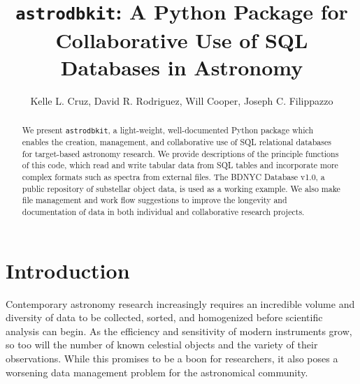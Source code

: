 \documentclass[iop,revtex4,natbib209]{emulateapj}
\begin{document}
\lstset{language=Python,upquote=true}

\title{\MakeLowercase{\texttt{astrodbkit}}: A Python Package for Collaborative Use of SQL Databases in Astronomy}

\author{Kelle L. Cruz,
David R. Rodriguez,
Will Cooper,
Joseph C. Filippazzo}






\begin{abstract}
We present \texttt{astrodbkit}, a light-weight, well-documented Python package which enables the creation, management, and collaborative use of SQL relational databases for target-based astronomy research. We provide descriptions of the principle functions of this code, which read and write tabular data from SQL tables and incorporate more complex formats such as spectra from external files. The BDNYC Database v1.0, a public repository of substellar object data, is used as a working example. We also make file management and work flow suggestions to improve the longevity and documentation of data in both individual and collaborative research projects.
\end{abstract}


\maketitle
\section{Introduction}{\label{sec:intro}}
Contemporary astronomy research increasingly requires an incredible volume and diversity of data to be collected, sorted, and homogenized before scientific analysis can begin. As the efficiency and sensitivity of modern instruments grow, so too will the number of known celestial objects and the variety of their observations. While this promises to be a boon for researchers, it also poses a worsening data management problem for the astronomical community.  
\end{document}
